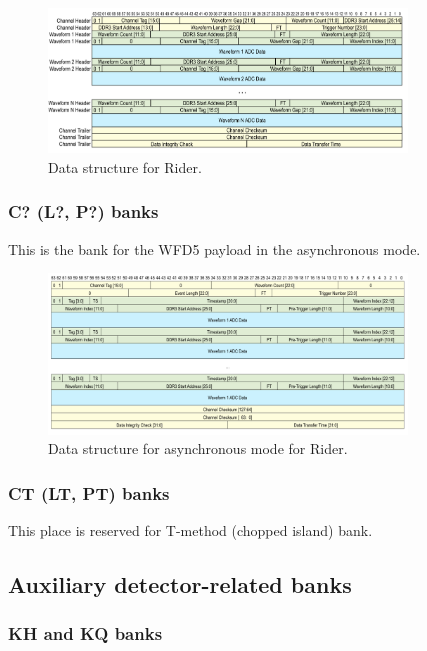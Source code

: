 \begin{figure}[htbp]
\centering
\includegraphics[width=0.85\textwidth]{pics/RiderData.pdf} 
\caption{Data structure for Rider.}\label{fig:RiderData}
\end{figure}

\subsubsection*{C? (L?, P?) banks}

This is the bank for the WFD5 payload in the asynchronous mode.

\begin{figure}[htbp]
\centering
\includegraphics[width=0.85\textwidth]{pics/AsyncRiderData.pdf} 
\caption{Data structure for asynchronous mode for Rider.}\label{fig:AsyncRiderData}
\end{figure}

\subsubsection*{CT (LT, PT) banks}

{\color{red}This place is reserved for T-method (chopped island) bank.}


\subsection{Auxiliary detector-related banks}

\subsubsection*{KH and KQ banks}

